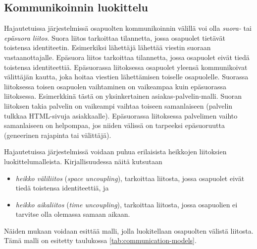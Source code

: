 \subsection{Kommunikoinnin luokittelu}
\label{ch:liitokset}
Hajautetuissa järjestelmissä osapuolten kommunikoinnin välillä voi olla \emph{suora-} tai \emph{epäsuora liitos}. Suora liitos tarkoittaa tilannetta, jossa osapuolet tietävät toistensa identiteetin. Esimerkiksi lähettäjä lähettää viestin suoraan vastaanottajalle. Epäsuora liitos tarkoittaa tilannetta, jossa osapuolet eivät tiedä toistensa identiteettiä. Epäsuorassa liitoksessa osapuolet yleensä kommunikoivat välittäjän kautta, joka hoitaa viestien lähettämisen toiselle osapuolelle. Suorassa liitoksessa toisen osapuolen vaihtaminen on vaikeampaa kuin epäsuorassa liitoksessa. Esimerkkinä tästä on yksinkertainen asiakas-palvelin-malli. Suoran liitoksen takia palvelin on vaikeampi vaihtaa toiseen samanlaiseen (palvelin tulkkaa HTML-sivuja asiakkaalle). Epäsuorassa liitoksessa palvelimen vaihto samanlaiseen on helpompaa, jos niiden välissä on tarpeeksi epäsuoruutta (geneerinen rajapinta tai välittäjä). \cite[s.~230]{distributed-systems-concepts-and-design}

Hajautetuissa järjestelmissä voidaan puhua erilaisista heikkojen liitoksien luokittelumalleista. Kirjallisuudessa näitä kutsutaan
\begin{itemize}
	\item \emph{heikko väliliitos} (\emph{space uncoupling}), tarkoittaa liitosta, jossa osapuolet eivät tiedä toistensa identiteettiä, ja
	\item \emph{heikko aikaliitos} (\emph{time uncoupling}), tarkoittaa liitosta, jossa osapuolien ei tarvitse olla olemassa samaan aikaan.
\end{itemize}
Näiden mukaan voidaan esittää malli, jolla luokitellaan osapuolten välistä liitosta. Tämä malli on esitetty taulukossa \ref{tab:communication-models}. \cite[s.~230]{distributed-systems-concepts-and-design} \cite[s.~116]{eugster2003many}

